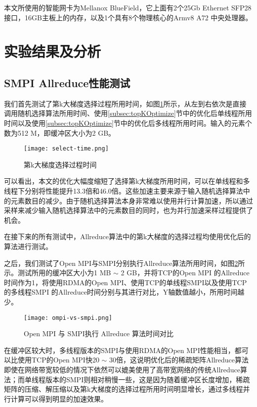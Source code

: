 本文所使用的智能网卡为Mellanox BlueField，它上面有2个25Gb Ethernet SFP28 接口，16GB主板上的内存，以及1个具有8个物理核心的Armv8 A72 中央处理器。

\section{实验结果及分析}
\subsection{SMPI Allreduce性能测试}

我们首先测试了第k大梯度选择过程所用时间，如图\ref{fig:select}所示，从左到右依次是直接调用随机选择算法所用时间、使用\ref{subsec:topKOptimize}节中的优化后单线程所用时间以及使用\ref{subsec:topKOptimize}节中的优化后多线程所用时间。输入的元素个数为512 M，即缓冲区大小为2 GB。

\begin{figure}[ht] %
    \centering
    \texttt{[image: select-time.png]}
    \caption{第k大梯度选择过程时间}
    \label{fig:select}
  \end{figure}

可以看出，本文的优化大幅度缩短了选择第k大梯度所用时间，可以在单线程和多线程下分别将性能提升13.3倍和46.0倍。这些加速主要来源于输入随机选择算法中的元素数目的减少。由于随机选择算法本身非常难以使用并行计算加速，所以通过采样来减少输入随机选择算法中的元素数目的同时，也为并行加速采样过程提供了机会。

在接下来的所有测试中，Allreduce算法中的第k大梯度的选择过程均使用优化后的算法进行测试。

之后，我们测试了Open MPI与SMPI分别执行Allreduce算法所用时间，如图\ref{fig:ompi-vs-smpi}所示。测试所用的缓冲区大小为1 MB $\sim$ 2 GB，并将TCP的Open MPI 的Allreduce时间作为1，将使用RDMA的Open MPI、使用TCP的单线程SMPI以及使用TCP的多线程SMPI 的Allreduce时间分别与其进行对比，Y轴数值越小，所用时间越少。

\begin{figure}[ht] %
    \centering
    \texttt{[image: ompi-vs-smpi.png]}
    \caption{Open MPI 与 SMPI执行 Allreduce 算法时间对比}
    \label{fig:ompi-vs-smpi}
  \end{figure}

在缓冲区较大时，多线程版本的SMPI与使用RDMA的Open MPI性能相当，都可以比使用TCP的Open MPI快20 $\sim$ 30倍，这说明优化后的稀疏矩阵Allreduce算法即使在网络带宽较低的情况下依然可以媲美使用了高带宽网络的传统Allreduce算法；而单线程版本的SMPI则相对稍慢一些，这是因为随着缓冲区长度增加，稀疏矩阵的压缩、解压缩以及第k大梯度的选择过程所用时间明显增长，通过多线程并行计算可以得到明显的加速效果。

